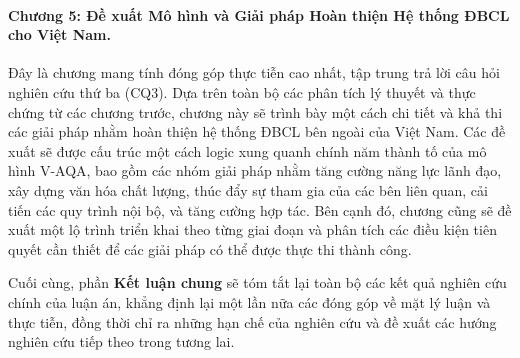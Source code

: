 \documentclass[12pt, a4paper, openany]{report}
\begin{document}
\paragraph{Chương 5: Đề xuất Mô hình và Giải pháp Hoàn thiện Hệ thống ĐBCL cho Việt Nam.}
Đây là chương mang tính đóng góp thực tiễn cao nhất, tập trung trả lời câu hỏi nghiên cứu thứ ba (CQ3). Dựa trên toàn bộ các phân tích lý thuyết và thực chứng từ các chương trước, chương này sẽ trình bày một cách chi tiết và khả thi các giải pháp nhằm hoàn thiện hệ thống ĐBCL bên ngoài của Việt Nam. Các đề xuất sẽ được cấu trúc một cách logic xung quanh chính năm thành tố của mô hình V-AQA, bao gồm các nhóm giải pháp nhằm tăng cường năng lực lãnh đạo, xây dựng văn hóa chất lượng, thúc đẩy sự tham gia của các bên liên quan, cải tiến các quy trình nội bộ, và tăng cường hợp tác. Bên cạnh đó, chương cũng sẽ đề xuất một lộ trình triển khai theo từng giai đoạn và phân tích các điều kiện tiên quyết cần thiết để các giải pháp có thể được thực thi thành công.

Cuối cùng, phần \textbf{Kết luận chung} sẽ tóm tắt lại toàn bộ các kết quả nghiên cứu chính của luận án, khẳng định lại một lần nữa các đóng góp về mặt lý luận và thực tiễn, đồng thời chỉ ra những hạn chế của nghiên cứu và đề xuất các hướng nghiên cứu tiếp theo trong tương lai.

% 
% 




\end{document}
